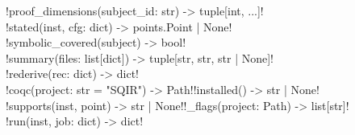 {\begin{signature}
\py!proof_dimensions(subject_id: str) -> tuple[int, ...]!\\
\py!stated(inst, cfg: dict) -> points.Point | None!\\
\py!symbolic_covered(subject) -> bool!\\
\py!summary(files: list[dict]) -> tuple[str, str, str | None]!\\
\py!rederive(rec: dict) -> dict!\\
\py!coqc(project: str = "SQIR") -> Path!\quad\py!installed() -> str | None!\\
\py!supports(inst, point) -> str | None!\quad\py!_flags(project: Path) -> list[str]!\\
\py!run(inst, job: dict) -> dict!
\end{signature}

}
